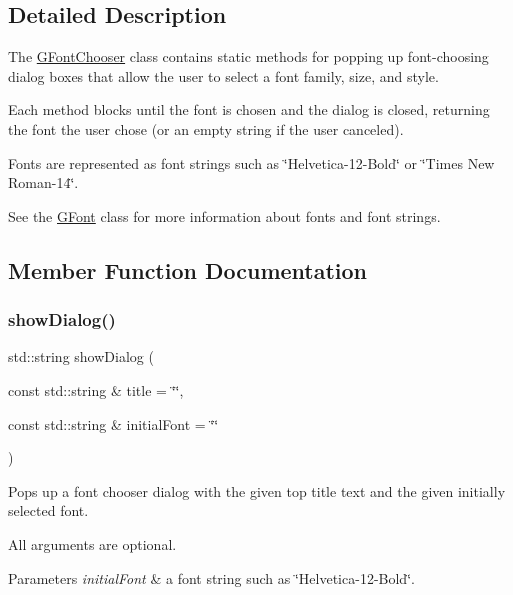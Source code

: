 \subsection{Detailed Description}
The \mbox{\hyperlink{classGFontChooser}{G\+Font\+Chooser}} class contains static methods for popping up font-\/choosing dialog boxes that allow the user to select a font family, size, and style. 

Each method blocks until the font is chosen and the dialog is closed, returning the font the user chose (or an empty string if the user canceled).

Fonts are represented as font strings such as \char`\"{}\+Helvetica-\/12-\/\+Bold\char`\"{} or \char`\"{}\+Times New Roman-\/14\char`\"{}.

See the \mbox{\hyperlink{classGFont}{G\+Font}} class for more information about fonts and font strings. 

\subsection{Member Function Documentation}
\mbox{\label{classGFontChooser_a93eece7081780910ac5878dc6c809f94}} 
\subsubsection{\texorpdfstring{show\+Dialog()}{showDialog()}\hspace{0.1cm}{\footnotesize\ttfamily [1/3]}}
{\footnotesize\ttfamily std\+::string show\+Dialog (\begin{DoxyParamCaption}\item[{const std\+::string \&}]{title = {\ttfamily \char`\"{}\char`\"{}},  }\item[{const std\+::string \&}]{initial\+Font = {\ttfamily \char`\"{}\char`\"{}} }\end{DoxyParamCaption})\hspace{0.3cm}{\ttfamily [static]}}



Pops up a font chooser dialog with the given top title text and the given initially selected font. 

All arguments are optional. 
\begin{DoxyParams}{Parameters}
{\em initial\+Font} & a font string such as \char`\"{}\+Helvetica-\/12-\/\+Bold\char`\"{}. \\
\hline
\end{DoxyParams}
\mbox{\label{classGFontChooser_a67dee62efca9f2c7fb6d80891a73c32f}} 
